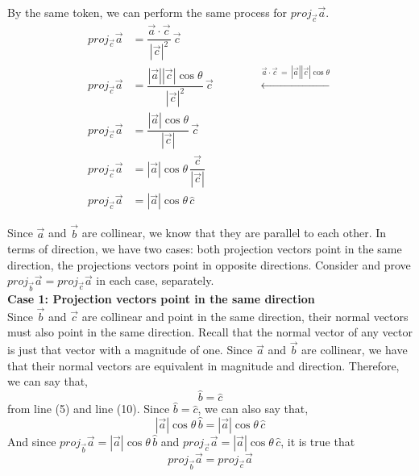 \documentclass[12pt]{book}
\begin{document}
\begin{enumerate}
\begin{enumerate}
By the same token, we can perform the same process for $proj_{\vec{c}}\vec{a}$.
\begingroup
\addtolength{\jot}{0.5em}
\begin{align}
    proj_{\vec{c}}\vec{a} &= \dfrac{\vec{a} \cdot \vec{c}}{|\vec{c}|^2} \, \vec{c} \\
    proj_{\vec{c}}\vec{a} &= \dfrac{|\vec{a}||\vec{c}|\cos\theta}{|\vec{c}|^2} \, \vec{c} \qquad \qquad \xleftarrow[]{\vec{a} \cdot \vec{c} \,=\, |\vec{a}||\vec{c}|\cos\theta}\\
    proj_{\vec{c}}\vec{a} &= \dfrac{|\vec{a}|\cos\theta}{|\vec{c}|} \, \vec{c} \\
    proj_{\vec{c}}\vec{a} &= |\vec{a}|\cos\theta \, \dfrac{\vec{c}}{|\vec{c}|} \\
    proj_{\vec{c}}\vec{a} &= |\vec{a}| \cos\theta \, \hat{c}
\end{align}
\endgroup

Since $\vec{a}$ and $\vec{b}$ are collinear, we know that they are parallel to each other. In terms of direction, we have two cases: both projection vectors point in the same direction, the projections vectors point in opposite directions. Consider and prove $proj_{\vec{b}}\vec{a} = proj_{\vec{c}}\vec{a}$ in each case, separately.\\

\textbf{Case 1: Projection vectors point in the same direction}\\
Since $\vec{b}$ and $\vec{c}$ are collinear and point in the same direction, their normal vectors must also point in the same direction. Recall that the normal vector of any vector is just that vector with a magnitude of one. Since $\vec{a}$ and $\vec{b}$ are collinear, we have that their normal vectors are equivalent in magnitude and direction. Therefore, we can say that,
$$\hat{b} = \hat{c}$$
from line (5) and line (10). Since $\hat{b} = \hat{c}$, we can also say that,
$$|\vec{a}| \cos\theta \, \hat{b} = |\vec{a}| \cos\theta \, \hat{c}$$
And since $proj_{\vec{b}}\vec{a} = |\vec{a}| \cos\theta \, \hat{b}$ and $proj_{\vec{c}}\vec{a} = |\vec{a}| \cos\theta \, \hat{c}$, it is true that
$$proj_{\vec{b}}\vec{a} = proj_{\vec{c}}\vec{a}$$


\end{enumerate}
\end{enumerate}
\end{document}
